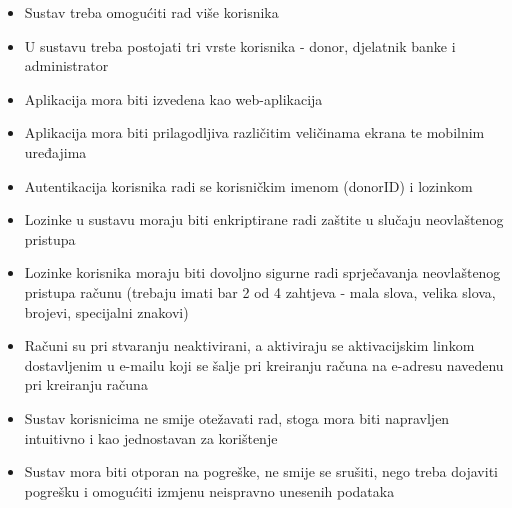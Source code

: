 			 \begin{itemize}
			     \item Sustav treba omogućiti rad više korisnika
			     \item U sustavu treba postojati tri vrste korisnika - donor, djelatnik banke i administrator
			     \item Aplikacija mora biti izvedena kao web-aplikacija
			     \item Aplikacija mora biti prilagodljiva različitim veličinama ekrana te mobilnim uređajima
			     \item Autentikacija korisnika radi se korisničkim imenom (donorID) i lozinkom
			     \item Lozinke u sustavu moraju biti enkriptirane radi zaštite u slučaju neovlaštenog pristupa
			     \item Lozinke korisnika moraju biti dovoljno sigurne radi sprječavanja neovlaštenog pristupa računu (trebaju imati bar 2 od 4 zahtjeva - mala slova, velika slova, brojevi, specijalni znakovi) 
			     \item Računi su pri stvaranju neaktivirani, a aktiviraju se aktivacijskim linkom dostavljenim u e-mailu koji se šalje pri kreiranju računa na e-adresu navedenu pri kreiranju računa
			     \item Sustav korisnicima ne smije otežavati rad, stoga mora biti napravljen intuitivno i kao jednostavan za korištenje
			     \item Sustav mora biti otporan na pogreške, ne smije se srušiti, nego treba dojaviti pogrešku i omogućiti izmjenu neispravno unesenih podataka
			 \end{itemize}
			 
			 
			 
	